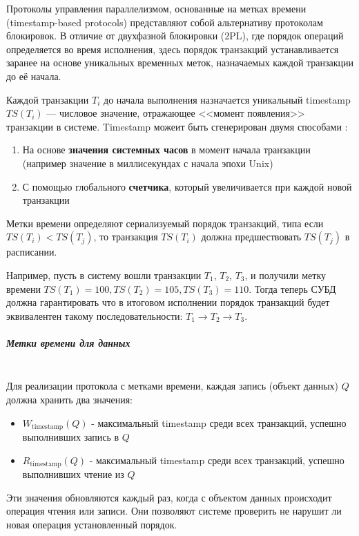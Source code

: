 Протоколы управления параллелизмом, основанные на метках времени (timestamp-based protocols) представляют собой альтернативу протоколам блокировок. В отличие от двухфазной блокировки (2PL), где порядок операций определяется во время исполнения, здесь порядок транзакций устанавливается заранее на основе уникальных временных меток, назначаемых каждой транзакции до её начала.

Каждой транзакции $T_i$ до начала выполнения назначается уникальный timestamp $TS(T_i)$ — числовое значение, отражающее <<момент появления>> транзакции в системе. Timestamp можеит быть сгенерирован двумя способами \autocite[ch.18 §5]{Silberschatz}:
\begin{enumerate}
    \item На основе \textbf{значения системных часов} в момент начала транзакции (например значение в миллисекундах с начала эпохи Unix)
    \item С помощью глобального \textbf{счетчика}, который увеличивается при каждой новой транзакции 
\end{enumerate}

Метки времени определяют сериализуемый порядок транзакций, типа если $TS(T_i) < TS(T_j)$, то транзакция $TS(T_i)$ должна предшествовать $TS(T_j)$ в расписании.

Например, пусть в систему вошли транзакции $T_1$, $T_2$, $T_3$, и получили метку времени $TS(T_1) = 100, TS(T_2) = 105, TS(T_3) = 110$. Тогда теперь СУБД должна гарантировать что в итоговом исполнении порядок транзакций будет эквивалентен такому последовательности: $T_1 \rightarrow T_2 \rightarrow T_3$.

\subparagraph{Метки времени для данных} ~\\

Для реализации протокола с метками времени, каждая запись (объект данных) $Q$ должна хранить два значения:

\begin{itemize}
    \item $W_{\text{timestamp}}(Q)$ - максимальный timestamp среди всех транзакций, успешно выполнивших запись в $Q$
    \item $R_{\text{timestamp}}(Q)$ - максимальный timestamp среди всех транзакций, успешно выполнивших чтение из $Q$
\end{itemize}


Эти значения обновляются каждый раз, когда с объектом данных происходит операция чтения или записи. Они позволяют системе проверить не нарушит ли новая операция установленный порядок.

